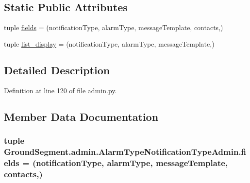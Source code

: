 \subsection*{Static Public Attributes}
\begin{DoxyCompactItemize}
\item 
tuple \hyperlink{class_ground_segment_1_1admin_1_1_alarm_type_notification_type_admin_ab3af7d89ca887c04a133e2a55d166e62}{fields} = (\textquotesingle{}notification\+Type\textquotesingle{}, \textquotesingle{}alarm\+Type\textquotesingle{}, \textquotesingle{}message\+Template\textquotesingle{}, \textquotesingle{}contacts\textquotesingle{},)
\item 
tuple \hyperlink{class_ground_segment_1_1admin_1_1_alarm_type_notification_type_admin_ac52ed410fef4e7f5105e37235b7453ee}{list\+\_\+display} = (\textquotesingle{}notification\+Type\textquotesingle{}, \textquotesingle{}alarm\+Type\textquotesingle{}, \textquotesingle{}message\+Template\textquotesingle{},)
\end{DoxyCompactItemize}


\subsection{Detailed Description}


Definition at line 120 of file admin.\+py.



\subsection{Member Data Documentation}
\hypertarget{class_ground_segment_1_1admin_1_1_alarm_type_notification_type_admin_ab3af7d89ca887c04a133e2a55d166e62}{}
\subsubsection[{fields}]{\setlength{\rightskip}{0pt plus 5cm}tuple Ground\+Segment.\+admin.\+Alarm\+Type\+Notification\+Type\+Admin.\+fields = (\textquotesingle{}notification\+Type\textquotesingle{}, \textquotesingle{}alarm\+Type\textquotesingle{}, \textquotesingle{}message\+Template\textquotesingle{}, \textquotesingle{}contacts\textquotesingle{},)\hspace{0.3cm}{\ttfamily [static]}}\label{class_ground_segment_1_1admin_1_1_alarm_type_notification_type_admin_ab3af7d89ca887c04a133e2a55d166e62}


